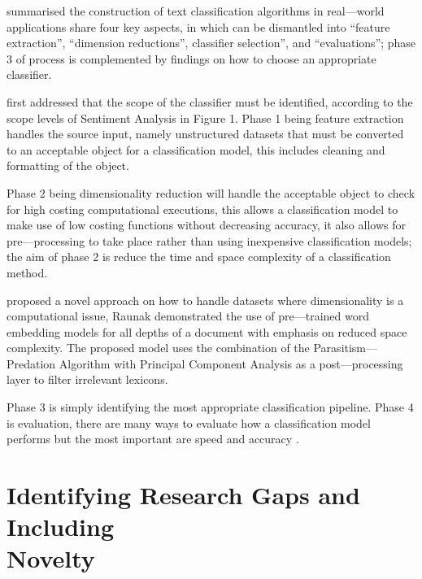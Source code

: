 \textcite{kowsari2019text} summarised the construction of text classification algorithms in real---world applications share four key aspects, in which can be dismantled into “feature extraction”, “dimension reductions”, classifier selection”, and “evaluations”; phase 3 of \textcite{kowsari2019text} process is complemented by \textcite{enriquez2013comparative} findings on how to choose an appropriate classifier.

\textcite{kowsari2019text} first addressed that the scope of the classifier must be identified, according to the scope levels of Sentiment Analysis in Figure 1. Phase 1 being feature extraction handles the source input, namely unstructured datasets that must be converted to an acceptable object for a classification model, this includes cleaning and formatting of the object.

Phase 2 being dimensionality reduction will handle the acceptable object to check for high costing computational executions, this allows a classification model to make use of low costing functions without decreasing accuracy, it also allows for pre---processing to take place rather than using inexpensive classification models; the aim of phase 2 is reduce the time and space complexity of a classification method.

\textcite{raunak2019effective} proposed a novel approach on how to handle datasets where dimensionality is a computational issue, Raunak demonstrated the use of pre---trained word embedding models for all depths of a document with emphasis on reduced space complexity. The proposed model uses the combination of the Parasitism---Predation Algorithm with Principal Component Analysis as a post---processing layer to filter irrelevant lexicons.

Phase 3 is simply identifying the most appropriate classification pipeline. Phase 4 is evaluation, there are many ways to evaluate how a classification model performs but the most important are speed and accuracy \textcite{kowsari2019text}.

\newpage

\section[Identifying Research Gaps and Including Novelty]{\texorpdfstring{Identifying Research Gaps and Including \\ Novelty}{Identifying Research Gaps and Including Novelty}} \label{section:IdentifyingResearchGapsandIncludingNovelty}

